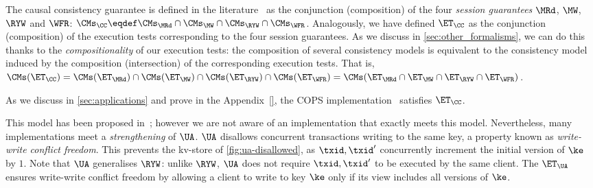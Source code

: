 %
%
%
%
%
The causal consistency guarantee is defined in the literature~\cite{session2causal} as the conjunction (composition) of the four \emph{session guarantees} \(\MRd\), \(\MW\), \(\RYW\) and \(\WFR\):   
$\CMs_{\CC} \eqdef \CMs_{\MRd} \cap \CMs_{\MW} \cap \CMs_{\RYW} \cap \CMs_{\WFR}$. 
Analogously, we have defined $\ET_\CC$ as the conjunction (composition) of the execution tests corresponding to the four session guarantees.
As we discuss in \cref{sec:other_formalisms}, we can do this thanks to the \emph{compositionality} of our execution tests:
the composition of several consistency models is equivalent to the consistency model induced by the composition (intersection) of the corresponding execution tests. 
That is, $\CMs(\ET_\CC) = \CMs(\ET_{\MRd}) \cap \CMs(\ET_{\MW}) \cap
\CMs(\ET_{\RYW}) \cap \CMs(\ET_{\WFR}) = \CMs(\ET_{\MRd} \cap
\ET_{\MW} \cap \ET_{\RYW} \cap \ET_{\WFR})$.



As we discuss in \cref{sec:applications} and prove in the Appendix~\ref{},  the COPS
implementation~\cite{} satisfies
$\ET_{\CC}$. 

This model has been proposed in~\cite{framework-concur};
however we are not aware of an implementation that exactly meets  this model.
Nevertheless, many implementations meet a
\emph{strengthening} of $\UA$.
$\UA$ disallows concurrent transactions writing to the same key,
a property known as \emph{write-write conflict freedom}.
This prevents the kv-store of \cref{fig:ua-disallowed},
as $\txid, \txid'$ concurrently increment the initial version of $\ke$ by $1$.
Note that $\UA$ generalises $\RYW$: unlike $\RYW$, $\UA$ does not require $\txid, \txid'$ to be executed by the same client.
The $\ET_\UA$ ensures write-write conflict freedom by allowing a client to write to key $\ke$
only if its view includes all versions of $\ke$.

